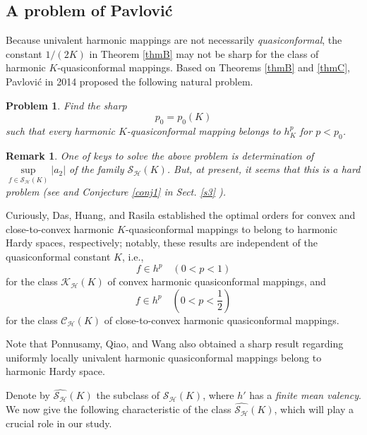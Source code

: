\documentclass[11pt, reqno]{amsart}
\newtheorem{prob}{Problem}
\newtheorem{rem}{Remark}
\numberwithin{equation}{section}
\newcommand{\abs}[1]{\left\vert#1\right\vert}
\begin{document}
\subsection{A problem of Pavlovi\'{c}}
Because univalent harmonic mappings are not necessarily \textit{quasiconformal}, the constant $1/(2K)$ in Theorem \ref{thmB} may not be sharp for the class of harmonic $K$-quasiconformal mappings. Based on Theorems \ref{thmB} and \ref{thmC}, Pavlovi\'{c} \cite[p. 315, Problem 10.2]{pav} in 2014 proposed the following natural problem.


\begin{prob}\label{p1}
{Find the sharp $$p_0=p_0(K)$$ such that every harmonic $K$-quasiconformal mapping belongs to $h^p_K$ for $p<p_0$.}
\end{prob}

\begin{rem}\label{r02}
{\rm One of keys to solve the above problem %
is determination of $\sup\limits_{f\in\mathcal{S}_\mathcal{H}(K)}\abs{a_2}$ of the family $\mathcal{S}_\mathcal{H}(K)$.
But, at present, it seems that this is a \textit{hard} problem (see \cite[Proposition 1.6]{cp} and 
Conjecture \ref{conj1} in Sect. \ref{s3}%
).}
\end{rem}

Curiously, Das, Huang, and Rasila \cite[Theorem 3]{dhr} established the optimal orders for convex and close-to-convex harmonic $K$-quasiconformal mappings to belong to harmonic Hardy spaces, respectively; notably, these results are independent of the quasiconformal constant $K$, i.e.,
$$f\in h^p\quad\left(0<p<1\right)$$ for the class $\mathcal{K}_\mathcal{H}(K)$ of 
convex harmonic quasiconformal mappings, and 
$$f\in h^p\quad\left(0<p<\frac{1}{2}\right)$$ for the class $\mathcal{C}_\mathcal{H}(K)$ of 
close-to-convex harmonic quasiconformal mappings. %

Note that Ponnusamy, Qiao, and Wang \cite[Theorem 4.2]{pqw} also obtained a sharp result regarding uniformly locally univalent harmonic quasiconformal mappings belong to harmonic Hardy space.

 Denote by  $\widehat{\mathcal{S}_\mathcal{H}}(K)$ the subclass of $\mathcal{S}_\mathcal{H}(K)$, %
where $h'$ has a \textit{finite mean valency}. We now give the following characteristic of the class $\widehat{\mathcal{S}_\mathcal{H}}(K)$, which will play a crucial role in our study.
\end{document}
